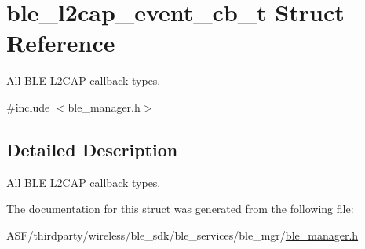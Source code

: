 \hypertarget{structble__l2cap__event__cb__t}{}\section{ble\+\_\+l2cap\+\_\+event\+\_\+cb\+\_\+t Struct Reference}
\label{structble__l2cap__event__cb__t}


All B\+LE L2\+C\+AP callback types.  




{\ttfamily \#include $<$ble\+\_\+manager.\+h$>$}



\subsection{Detailed Description}
All B\+LE L2\+C\+AP callback types. 

The documentation for this struct was generated from the following file\+:\begin{DoxyCompactItemize}
\item 
A\+S\+F/thirdparty/wireless/ble\+\_\+sdk/ble\+\_\+services/ble\+\_\+mgr/\mbox{\hyperlink{ble__manager_8h}{ble\+\_\+manager.\+h}}\end{DoxyCompactItemize}
